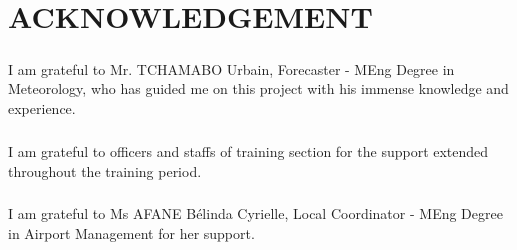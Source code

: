 \chapter*{\normalsize{\textbf{ACKNOWLEDGEMENT}}}
\paragraph{}
I am grateful to Mr. TCHAMABO Urbain, Forecaster - MEng Degree in Meteorology, who has guided me on this project with his immense knowledge and experience. 
\paragraph{}
I am grateful to officers and staffs of training section for the support extended throughout the training period.
\paragraph{}
I am grateful to Ms AFANE Bélinda Cyrielle, Local Coordinator - MEng Degree in Airport Management for her support.


